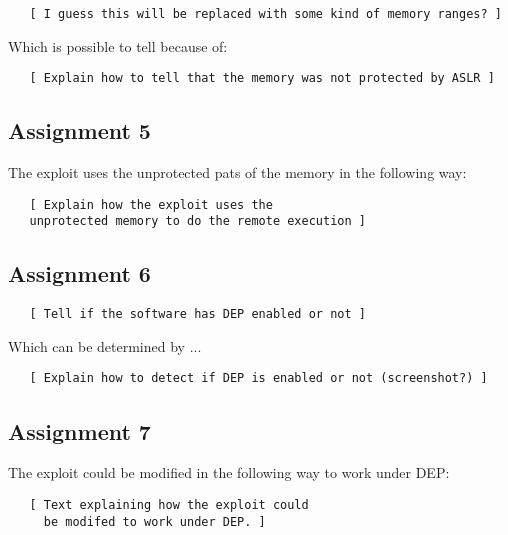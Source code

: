 \documentclass[10pt]{article}
\begin{document}
      \begin{verbatim}
   [ I guess this will be replaced with some kind of memory ranges? ]
      \end{verbatim}

      Which is possible to tell because of:

      \begin{verbatim}
   [ Explain how to tell that the memory was not protected by ASLR ]
      \end{verbatim}

    \subsection{Assignment 5}

      The exploit uses the unprotected pats of the memory in the following way:

      \begin{verbatim}
   [ Explain how the exploit uses the
   unprotected memory to do the remote execution ]
      \end{verbatim}

    \subsection{Assignment 6}

      \begin{verbatim}
   [ Tell if the software has DEP enabled or not ]
      \end{verbatim}

      Which can be determined by ...

      \begin{verbatim}
   [ Explain how to detect if DEP is enabled or not (screenshot?) ]
      \end{verbatim}


    \subsection{Assignment 7}

      The exploit could be modified in the following way to work under DEP:

      \begin{verbatim}
   [ Text explaining how the exploit could
     be modifed to work under DEP. ]
      \end{verbatim}
\end{document}
